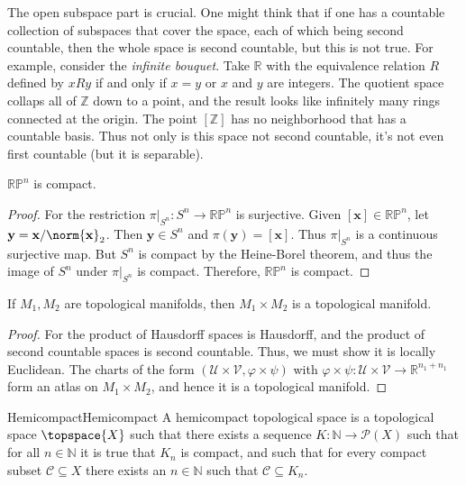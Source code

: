 \documentclass{article}                                                        %
\begin{document}
        The open subspace part is crucial. One might think that if one has a
        countable collection of subspaces that cover the space, each of which
        being second countable, then the whole space is second countable, but
        this is not true. For example, consider the \textit{infinite bouquet}.
        Take $\mathbb{R}$ with the equivalence relation $R$ defined by
        $xRy$ if and only if $x=y$ or $x$ and $y$ are integers. The quotient
        space collaps all of $\mathbb{Z}$ down to a point, and the result looks
        like infinitely many rings connected at the origin. The point
        $[\mathbb{Z}]$ has no neighborhood that has a countable basis. Thus not
        only is this space not second countable, it's not even first countable
        (but it is separable).
        \begin{theorem}
            $\mathbb{RP}^{n}$ is compact.
        \end{theorem}
        \begin{proof}
            For the restriction $\pi|_{S^{n}}:S^{n}\rightarrow\mathbb{RP}^{n}$
            is surjective. Given $[\mathbf{x}]\in\mathbb{RP}^{n}$, let
            $\mathbf{y}=\mathbf{x}/\norm{\mathbf{x}}_{2}$. Then
            $\mathbf{y}\in{S}^{n}$ and $\pi(\mathbf{y})=[\mathbf{x}]$. Thus
            $\pi|_{S^{n}}$ is a continuous surjective map. But $S^{n}$ is
            compact by the Heine-Borel theorem, and thus the image of
            $S^{n}$ under $\pi|_{S^{n}}$ is compact. Therefore,
            $\mathbb{RP}^{n}$ is compact.
        \end{proof}
        \begin{theorem}
            If $M_{1},M_{2}$ are topological manifolds, then
            $M_{1}\times{M}_{2}$ is a topological manifold.
        \end{theorem}
        \begin{proof}
            For the product of Hausdorff spaces is Hausdorff, and the product
            of second countable spaces is second countable. Thus, we must show
            it is locally Euclidean. The charts of the form
            $(\mathcal{U}\times\mathcal{V},\varphi\times\psi)$ with
            $\varphi\times\psi:\mathcal{U}\times\mathcal{V}%
             \rightarrow\mathbb{R}^{n_{1}+n_{1}}$ form an atlas on
            $M_{1}\times{M}_{2}$, and hence it is a topological manifold.
        \end{proof}
        \begin{fdefinition}{Hemicompact}{Hemicompact}
            A hemicompact topological space is a topological space
            $\topspace{X}$ such that there exists a sequence
            $K:\mathbb{N}\rightarrow\mathcal{P}(X)$ such that for all
            $n\in\mathbb{N}$ it is true that $K_{n}$ is compact, and such that
            for every compact subset $\mathcal{C}\subseteq{X}$ there exists an
            $n\in\mathbb{N}$ such that $\mathcal{C}\subseteq{K}_{n}$.
        \end{fdefinition}
\end{document}
